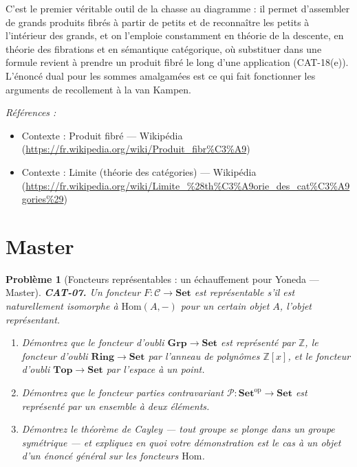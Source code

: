\documentclass[11pt]{article}
\newtheorem{problem}{Problème}
\newenvironment{refs}{\par\small\noindent\emph{Références :}\begin{itemize}\setlength\itemsep{0pt}}{\end{itemize}\normalsize}
\begin{document}
\noindent C'est le premier véritable outil de la chasse au diagramme : il permet
d'assembler de grands produits fibrés à partir de petits et de reconnaître les petits à
l'intérieur des grands, et on l'emploie constamment en théorie de la descente, en théorie des
fibrations et en sémantique catégorique, où substituer dans une formule revient à prendre un
produit fibré le long d'une application (CAT-18(e)). L'énoncé dual pour les sommes amalgamées est
ce qui fait fonctionner les arguments de recollement à la van Kampen.

\begin{refs}
\item Contexte : Produit fibré --- Wikipédia (\url{https://fr.wikipedia.org/wiki/Produit_fibr%C3%A9})
\item Contexte : Limite (théorie des catégories) --- Wikipédia (\url{https://fr.wikipedia.org/wiki/Limite_%28th%C3%A9orie_des_cat%C3%A9gories%29})
\end{refs}

\bigskip


\section*{Master}

\begin{problem}[{Foncteurs représentables : un échauffement pour Yoneda --- Master}]
\textbf{CAT-07.} Un foncteur $ F\colon \mathcal{C} \to \mathbf{Set} $ est
\textit{représentable} s'il est naturellement isomorphe à $ \mathrm{Hom}(A, -) $ pour un certain
objet $ A $, l'\textit{objet représentant}.
\begin{enumerate}
\item[(a)] Démontrez que le foncteur d'oubli
$ \mathbf{Grp} \to \mathbf{Set} $ est représenté par $ \mathbb{Z} $, le foncteur d'oubli
$ \mathbf{Ring} \to \mathbf{Set} $ par l'anneau de polynômes $ \mathbb{Z}[x] $, et le
foncteur d'oubli $ \mathbf{Top} \to \mathbf{Set} $ par l'espace à un point.
\item[(b)] Démontrez
que le foncteur parties contravariant $ \mathcal{P}\colon \mathbf{Set}^{\mathrm{op}} \to
\mathbf{Set} $ est représenté par un ensemble à deux éléments.
\item[(c)] Démontrez le théorème de Cayley --- tout
groupe se plonge dans un groupe symétrique --- et expliquez en quoi votre démonstration est le cas
à un objet d'un énoncé général sur les foncteurs $ \mathrm{Hom} $.
\end{enumerate}

\end{problem}
\end{document}
